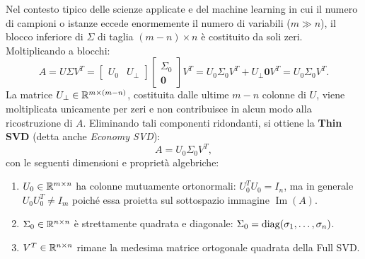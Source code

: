 Nel contesto tipico delle scienze applicate e del machine learning in cui il numero di campioni o istanze eccede enormemente il numero di variabili ($m \gg n$), il blocco inferiore di $\Sigma$ di taglia $(m-n) \times n$ \`e costituito da soli zeri. Moltiplicando a blocchi:
\begin{equation}
    A = U \Sigma V^T = \begin{bmatrix} U_0 & U_{\perp} \end{bmatrix} \begin{bmatrix} \Sigma_0 \\ \mathbf{0} \end{bmatrix} V^T = U_0 \Sigma_0 V^T + U_{\perp} \mathbf{0} V^T = U_0 \Sigma_0 V^T.
\end{equation}
La matrice $U_{\perp} \in \mathbb{R}^{m \times (m-n)}$, costituita dalle ultime $m-n$ colonne di $U$, viene moltiplicata unicamente per zeri e non contribuisce in alcun modo alla ricostruzione di $A$.
Eliminando tali componenti ridondanti, si ottiene la \textbf{Thin SVD} (detta anche \textit{Economy SVD}):
\begin{equation}
    A = U_0 \Sigma_0 V^T,
\end{equation}
con le seguenti dimensioni e propriet\`a algebriche:
\begin{enumerate}
    \item $U_0 \in \mathbb{R}^{m \times n}$ ha colonne mutuamente ortonormali: $U_0^T U_0 = I_n$, ma in generale $U_0 U_0^T \neq I_m$ poich\'e essa proietta sul sottospazio immagine $\operatorname{Im}(A)$.
    \item $\Sigma_0 \in \mathbb{R}^{n \times n}$ \`e strettamente quadrata e diagonale: $\Sigma_0 = \operatorname{diag}(\sigma_1, \dots, \sigma_n)$.
    \item $V^T \in \mathbb{R}^{n \times n}$ rimane la medesima matrice ortogonale quadrata della Full SVD.
\end{enumerate}

